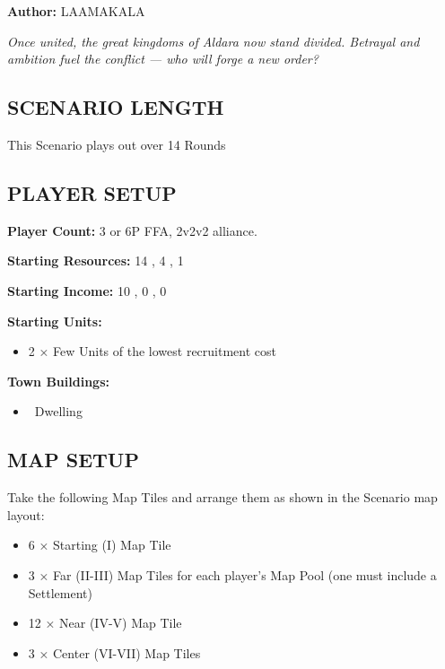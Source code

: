 
\begin{multicols*}{2}

\textbf{Author:} LAAMAKALA

\textit{Once united, the great kingdoms of Aldara now stand divided. Betrayal and ambition fuel the conflict — who will forge a new order?}%

\subsection*{\MakeUppercase{Scenario Length}}
This Scenario plays out over 14 Rounds

\subsection*{\MakeUppercase{Player Setup}}
\textbf{Player Count:} 3 or 6P FFA, 2v2v2 alliance.

\textbf{Starting Resources:} 14 , 4 , 1 

\textbf{Starting Income:} 10 , 0 , 0 

\textbf{Starting Units:}

\begin{itemize}
  \item 2 × Few  Units of the lowest recruitment cost
\end{itemize}

\textbf{Town Buildings:}
\begin{itemize}
  \item \bronze\ Dwelling
\end{itemize}

\subsection*{\MakeUppercase{Map Setup}}
Take the following Map Tiles and arrange them as shown in the Scenario map layout:

\begin{itemize}
  \item 6 × Starting (I) Map Tile
  \item 3 × Far (II-III) Map Tiles for each player's Map Pool (one must include a Settlement)
  \item 12 × Near (IV-V) Map Tile
  \item 3 × Center (VI-VII) Map Tiles
\end{itemize}


\end{multicols*}
